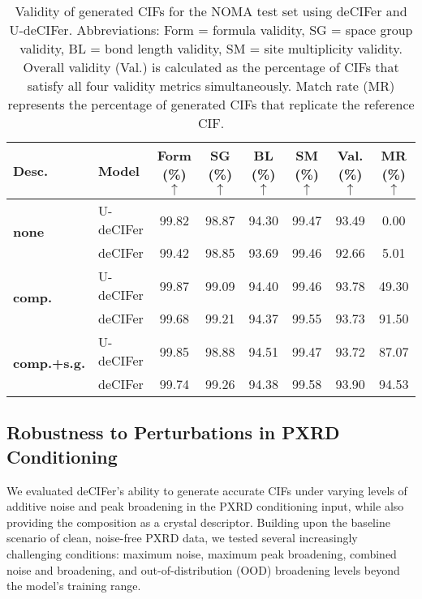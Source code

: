 \begin{table}[ht!]
\setlength{\tabcolsep}{2pt} %
\caption{Validity of generated CIFs for the NOMA test set using deCIFer and U-deCIFer. Abbreviations: Form = formula validity, SG = space group validity, BL = bond length validity, SM = site multiplicity validity. Overall validity (Val.) is calculated as the percentage of CIFs that satisfy all four validity metrics simultaneously. Match rate (MR) represents the percentage of generated CIFs that replicate the reference CIF.}
\label{tab:baseline_validity}
\vskip 0.1in
\begin{center}
\tiny
\begin{tabular}{llcccccc} 
\toprule
{\bf Desc.} & {Model} & Form (\%) $\uparrow$ & SG (\%) $\uparrow$ & BL (\%) $\uparrow$ & SM (\%) $\uparrow$ & Val. (\%) $\uparrow$ & MR (\%) $\uparrow$\\
\midrule
\multirow{2}{*}{\bf none} 
& U-deCIFer & 99.82 & 98.87 & 94.30 & 99.47 & 93.49 & 0.00 \\
& deCIFer   & 99.42 & 98.85 & 93.69 & 99.46 & 92.66 & 5.01 \\
\midrule
\multirow{2}{*}{\bf comp.} 
& U-deCIFer & 99.87 & 99.09 & 94.40 & 99.46 & 93.78 & 49.30 \\
& deCIFer   & 99.68 & 99.21 & 94.37 & 99.55 & 93.73 & 91.50 \\
\midrule
\multirow{2}{*}{\bf comp.+s.g.} 
& U-deCIFer & 99.85 & 98.88 & 94.51 & 99.47 & 93.72 & 87.07 \\
& deCIFer   & 99.74 & 99.26 & 94.38 & 99.58 & 93.90 & 94.53 \\
\bottomrule
\end{tabular}
\end{center}
\vskip -0.1in
\end{table}

\subsection{Robustness to Perturbations in PXRD Conditioning}

We evaluated deCIFer's ability to generate accurate CIFs under varying levels of additive noise and peak broadening in the PXRD conditioning input, while also providing the composition as a crystal descriptor. Building upon the baseline scenario of clean, noise-free PXRD data, we tested several increasingly challenging conditions: maximum noise, maximum peak broadening, combined noise and broadening, and out-of-distribution (OOD) broadening levels beyond the model's training range.

